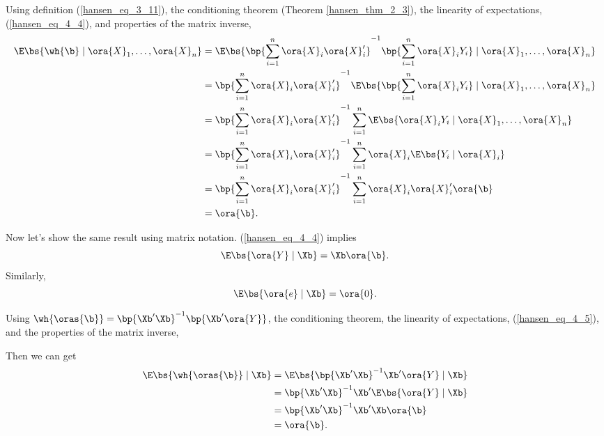 Using definition (\ref{hansen_eq_3_11}), the conditioning theorem (Theorem \ref{hansen_thm_2_3}), the linearity of expectations, (\ref{hansen_eq_4_4}), and properties of the matrix inverse,
\begin{equation}
    \notag
    \begin{aligned}
        \E\bs{\wh{\b} \mid \ora{X}_1, \ldots, \ora{X}_n} & = \E \bs{\bp{\sum_{i=1}^n \ora{X}_i \ora{X}_i^\prime}^{-1} \bp{\sum_{i=1}^n \ora{X}_i Y_i} \mid \ora{X}_1, \ldots, \ora{X}_n} \\
        & = \bp{\sum_{i=1}^n \ora{X}_i \ora{X}_i^\prime}^{-1} \E \bs{\bp{\sum_{i=1}^n \ora{X}_i Y_i} \mid \ora{X}_1, \ldots, \ora{X}_n} \\
        & = \bp{\sum_{i=1}^n \ora{X}_i \ora{X}_i^\prime}^{-1} \sum_{i=1}^n \E \bs{ \ora{X}_i Y_i \mid \ora{X}_1, \ldots, \ora{X}_n} \\
        & = \bp{\sum_{i=1}^n \ora{X}_i \ora{X}_i^\prime}^{-1} \sum_{i=1}^n \ora{X}_i \E\bs{Y_i \mid \ora{X}_i} \\
        & = \bp{\sum_{i=1}^n \ora{X}_i \ora{X}_i^\prime}^{-1} \sum_{i=1}^n \ora{X}_i \ora{X}_i^\prime \ora{\b} \\
        & = \ora{\b}.
    \end{aligned}
\end{equation}

Now let's show the same result using matrix notation. (\ref{hansen_eq_4_4}) implies
\begin{equation}
    \label{hansen_eq_4_5}
    \E\bs{\ora{Y} \mid \Xb} = \Xb \ora{\b}.
\end{equation}
Similarly, 
\begin{equation}
    \notag
    \E\bs{\ora{e} \mid \Xb} = \ora{0}.
\end{equation}

Using $\wh{\oras{\b}} = \bp{\Xb^\prime \Xb}^{-1} \bp{\Xb^\prime \ora{Y}}$, the conditioning theorem, the linearity of expectations, (\ref{hansen_eq_4_5}), and the properties of the matrix inverse,

Then we can get 
\begin{equation}
    \notag
    \begin{aligned}
        \E\bs{\wh{\oras{\b}} \mid \Xb} & = \E \bs{\bp{\Xb^\prime \Xb}^{-1} \Xb^\prime \ora{Y} \mid \Xb} \\
        & = \bp{\Xb^\prime \Xb}^{-1} \Xb^\prime \E \bs{\ora{Y} \mid \Xb} \\
        & = \bp{\Xb^\prime \Xb}^{-1} \Xb^\prime \Xb \ora{\b} \\
        & = \ora{\b} .
    \end{aligned}
\end{equation}

